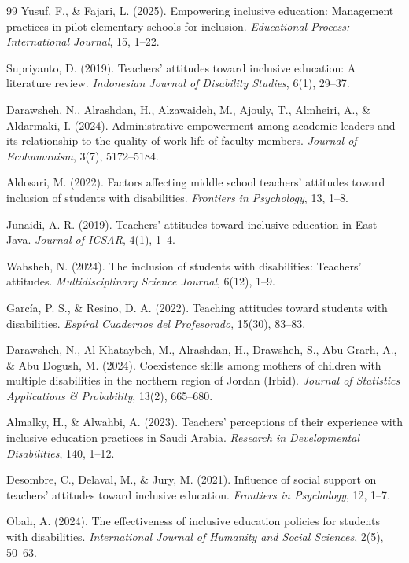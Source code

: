 \documentclass[10pt]{NSP1}
\begin{document}
\begin{thebibliography}{99}
		Yusuf, F., \& Fajari, L. (2025). Empowering inclusive education: Management practices in pilot elementary schools for inclusion. \textit{Educational Process: International Journal}, 15, 1--22.

		Supriyanto, D. (2019). Teachers' attitudes toward inclusive education: A literature review. \textit{Indonesian Journal of Disability Studies}, 6(1), 29--37.

		Darawsheh, N., Alrashdan, H., Alzawaideh, M., Ajouly, T., Almheiri, A., \& Aldarmaki, I. (2024). Administrative empowerment among academic leaders and its relationship to the quality of work life of faculty members. \textit{Journal of Ecohumanism}, 3(7), 5172--5184.

		Aldosari, M. (2022). Factors affecting middle school teachers' attitudes toward inclusion of students with disabilities. \textit{Frontiers in Psychology}, 13, 1--8.

		Junaidi, A. R. (2019). Teachers' attitudes toward inclusive education in East Java. \textit{Journal of ICSAR}, 4(1), 1--4.

		Wahsheh, N. (2024). The inclusion of students with disabilities: Teachers' attitudes. \textit{Multidisciplinary Science Journal}, 6(12), 1--9.

		Garc\'{i}a, P. S., \& Resino, D. A. (2022). Teaching attitudes toward students with disabilities. \textit{Esp\'{i}ral Cuadernos del Profesorado}, 15(30), 83--83.

		Darawsheh, N., Al-Khataybeh, M., Alrashdan, H., Drawsheh, S., Abu Grarh, A., \& Abu Dogush, M. (2024). Coexistence skills among mothers of children with multiple disabilities in the northern region of Jordan (Irbid). \textit{Journal of Statistics Applications \& Probability}, 13(2), 665--680.

		Almalky, H., \& Alwahbi, A. (2023). Teachers' perceptions of their experience with inclusive education practices in Saudi Arabia. \textit{Research in Developmental Disabilities}, 140, 1--12.

		Desombre, C., Delaval, M., \& Jury, M. (2021). Influence of social support on teachers' attitudes toward inclusive education. \textit{Frontiers in Psychology}, 12, 1--7.

		Obah, A. (2024). The effectiveness of inclusive education policies for students with disabilities. \textit{International Journal of Humanity and Social Sciences}, 2(5), 50--63.


\end{thebibliography}
\end{document}

